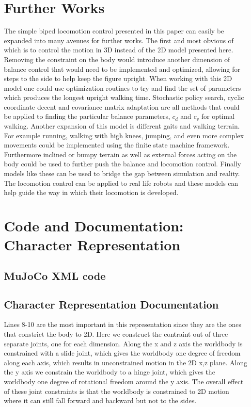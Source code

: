\documentclass[12pt, a4paper]{article}
\begin{document}
\section{Further Works}
The simple biped locomotion control presented in this paper can easily be expanded into many avenues for further works. The first and most obvious of which is to control the motion in 3D instead of the 2D model presented here. Removing the constraint on the body would introduce another dimension of balance control that would need to be implemented and optimized, allowing for steps to the side to help keep the figure upright. When working with this 2D model one could use optimization routines to try and find the set of parameters which produces the longest upright walking time. Stochastic policy search, cyclic coordinate decent and covariance matrix adaptation are all methods that could be applied to finding the particular balance parameters, $c_d$ and $c_v$ for optimal walking. Another expansion of this model is different gaits and walking terrain. For example running, walking with high knees, jumping, and even more complex movements could be implemented using the finite state machine framework. Furthermore inclined or bumpy terrain as well as external forces acting on the body could be used to further push the balance and locomotion control. Finally models like these can be used to bridge the gap between simulation and reality. The locomotion control can be applied to real life robots and these models can help guide the way in which their locomotion is developed. 

\newpage
{}
\newpage

\appendix
\section{Code and Documentation: Character Representation}
\label{apdx: character}
\subsection{MuJoCo XML code}
\lstset{breaklines=true,breakatwhitespace = false, basicstyle=\footnotesize, numbers=left}

\subsection{Character Representation Documentation}
Lines 8-10 are the most important in this representation since they are the ones that constrict the body to 2D. Here we construct the contraint out of three separate joints, one for each dimension. Along the x and z axis the worldbody is constrained with a slide joint, which gives the worldbody one degree of freedom along each axis, which results in unconstrained motion in the 2D x,z plane. Along the y axis we constrain the worldbody to a hinge joint, which gives the worldbody one degree of rotational freedom around the y axis. The overall effect of these joint constraints is that the worldbody is constrained to 2D motion where it can still fall forward and backward but not to the sides. \\
\end{document}
